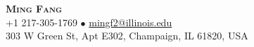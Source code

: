 \documentclass[letterpaper,11pt]{article} %
\begin{document}

% 
\begin{comment}
In Europe it is common to include a picture of ones self in the CV. Select
which heading appropriate for the document you are creating.
\end{comment}


\begin{center}
    \textbf{\Huge \scshape Ming Fang} \\ \vspace{1pt} %
    \small +1 217-305-1769 $\bullet$ 
    \href{mailto:mingf2@illinois.edu}{{mingf2@illinois.edu}}\\ \vspace{1pt}
    {303 W Green St, Apt E302, Champaign, IL 61820, USA}
\end{center}
\end{document}
